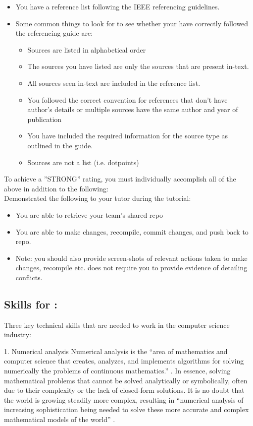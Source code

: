 \documentclass[a4paper, 11pt]{report}
\begin{document}
\begin{itemize}
\begin{itemize}
	\item You have a reference list following the IEEE referencing guidelines.
	\item Some common things to look for to see whether your have correctly followed the referencing guide are:
		\begin{itemize}
		\item Sources are listed in alphabetical order
		\item The sources you have listed are only the sources that are present in-text.
		\item All sources seen in-text are included in the reference list.
		\item You followed the correct convention for references that don’t have author’s details or multiple sources have the same author and year of publication
		\item You have included the required information for the source type as outlined in the guide.
		\item Sources are not a list (i.e. dotpoints)
		\end{itemize}
	\end{itemize}
\end{itemize}

To achieve a ''STRONG'' rating, you must individually accomplish all of the above in addition to the following:\\
Demonstrated the following to your tutor during the tutorial:
\begin{itemize}
\item You are able to retrieve your team’s shared repo
\item You are able to make changes, recompile, commit changes, and push back to repo.
\item Note: you should also provide screen-shots of relevant actions taken to make changes, recompile etc. does not require you to provide evidence of detailing conflicts.
\end{itemize}



\subsection{Skills for \majA: \studA}

Three key technical skills that are needed to work in the computer science industry:

1. Numerical analysis
Numerical analysis is the “area of mathematics and computer science that creates, analyzes, and implements algorithms for solving numerically the problems of continuous mathematics.” \cite{numan1}.  In essence, solving mathematical problems that cannot be solved analytically or symbolically, often due to their complexity or the lack of closed-form solutions. It is no doubt that the world is growing steadily more complex, resulting in “numerical analysis of increasing sophistication being needed to solve these more accurate and complex mathematical models of the world” \cite{numan2}.  
\end{document}
